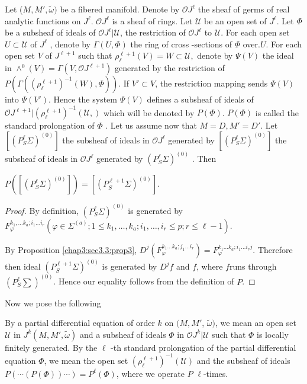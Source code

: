 Let ($M, M',\tilde{\omega}) $ be a fibered manifold. Denote by
$\mathscr{O}J^\ell $ the sheaf of germs of real analytic functions on
$J^\ell$. $\mathscr{O}J^\ell$ is a sheaf of rings. Let $\mathscr{U}$ be
an open set of $J^\ell$. Let $ \Phi $ be a subsheaf of  ideals of $
\mathscr{O}J^\ell|\mathscr{U}$, the restriction of $\mathscr{O}J^\ell
$ to $\mathscr{U} $. For each open set $ U \subset \mathscr{U}$ of $J^\ell
$ , denote by $\Gamma(U,\Phi) $ the ring of cross -sections of $\Phi$
over.$U$. For each open set $V$ of $ J^{\ell+1} $ such that
$\rho^{\ell+1}_\ell (V) = W\subset \mathscr{U}, $ denote by $ \Psi (V) $
the ideal in $\wedge^0 (V) = \Gamma (V, \mathscr{O}J^{\ell+1})$
generated by the restriction of  $P(\Gamma((\rho^{\ell+1}_\ell)^{-1}(W)
, \Phi))$. If $V'\subset V$, the restriction mapping sends $\Psi(V)$
into $ \Psi (V')$.  Hence the system $\Psi(V)$ defines a subsheaf of
ideals of $\mathscr{O }J^{\ell+1} |(\rho^{\ell+1}_\ell)^{-1}
(\mathscr{U},)$ which will be denoted by $ P(\Phi)$. $P(\Phi) $ is
called the standard  prolongation of $\Phi $ . Let us assume now that
$M= D, M'= D'$. Let $\left[(P^\ell_S \Sigma)^{(0)}\right] $ the
subsheaf of ideals in $\mathscr{O} J^\ell$ generated by
$[(P^\ell_S\Sigma ) ^{(0)}] $ the subsheaf of ideals in $
\mathscr{O}J^\ell $ generated by $(P^\ell_S \Sigma )^{(0) }$ . Then 

\begin{proposition}\label{chap3:sec3.15:prop25}%
  $P([(P_S^\ell \Sigma )^{(0)}]) = [(P^{\ell+1}_S \Sigma)^{(0)}]. $
\end{proposition}

\begin{proof}
  By definition, $ (P^\ell_S \Sigma)^{(0)}$ is generated by 
  $ F^{k_1,\ldots k_a; i_1\ldots i_r}_\varphi (\varphi\in \Sigma
  ^{(a)}; 1\leq k_1,\ldots,k_a; i_1,\ldots,i_r\leq p;r\leq \ell-1)$.  
  
  By Proposition \ref{chap3:sec3.3:prop3}, $ D^j(F_\varphi^{k_1\ldots k_a ; j_1\ldots i_r
  }) = F_\varphi ^{k_1\ldots k_a ; i_1\ldots i_r j } $. Therefore
  then ideal $(P^{\ell+1}_S \Sigma)^{(0)}$ is generated by $ D^jf $
  and $f$, where  
  $f$\pageoriginale runs through \break $(P_S^\ell \sum)^{(0)}$. Hence our equality follows
  from the definition of $P$. 
\end{proof}

Now we pose the following 
\begin{defi*}
  By a partial differential equation of order $k$ on $(M, M'$,
  $\tilde{\omega})$, we mean an open set $\mathcal{U}$ in $J^k(M,M',
  \tilde{\omega})$ and a subsheaf of ideals $\Phi$ in $\mathscr{O} J^k
  | \mathcal{U}$ such that $\Phi$ is locally finitely generated. By
  the $\ell$ -th standard prolongation of the partial differential
  equation $\Phi$, we mean the open set $(\rho^{\ell+1}_\ell)^{-1}
  (\mathcal{U})$ and the subsheaf of ideals $P(\cdots (P(\Phi))\cdots)
  = P^\ell (\Phi)$, where we operate $P$ $\ell$-times. 
\end{defi*}

